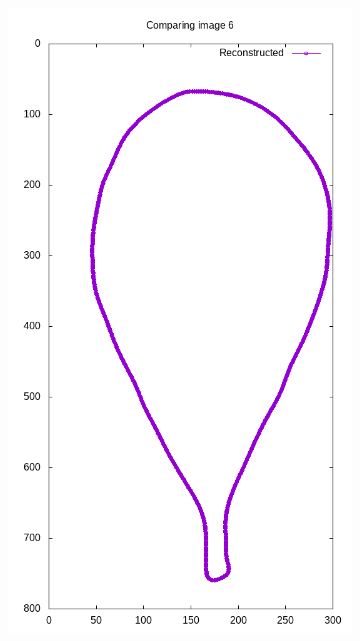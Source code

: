 \begin{frame}
\begin{figure}[ht!]
\begin{subfigure}[b]{0.19\textwidth}
		\includegraphics[width=\textwidth]{img/reconstructed.png}
	\end{subfigure}
	\label{fig:editedmesh}
\end{figure}

\end{frame}


